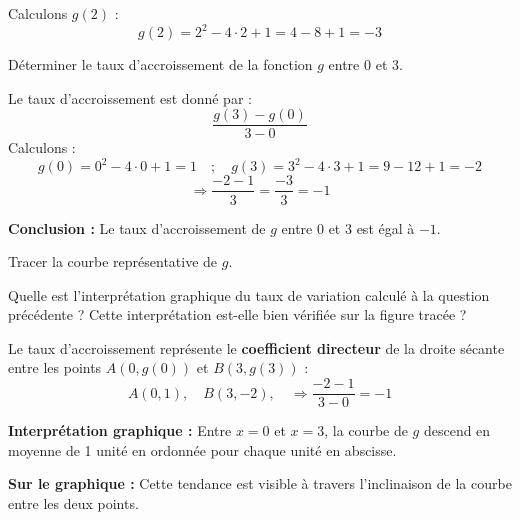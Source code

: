 \documentclass{exam}
\begin{document}
\begin{questions}
\begin{solution}
Calculons $g(2)$ :
\[
g(2) = 2^2 - 4 \cdot 2 + 1 = 4 - 8 + 1 = -3
\]

\begin{center}
\end{center}
\end{solution}

\question Déterminer le taux d’accroissement de la fonction $g$ entre $0$ et $3$.
\begin{solution}
Le taux d'accroissement est donné par :
\[
\frac{g(3) - g(0)}{3 - 0}
\]
Calculons :
\[
g(0) = 0^2 - 4 \cdot 0 + 1 = 1 \quad ; \quad g(3) = 3^2 - 4 \cdot 3 + 1 = 9 - 12 + 1 = -2
\]
\[
\Rightarrow \frac{-2 - 1}{3} = \frac{-3}{3} = -1
\]

\textbf{Conclusion :} Le taux d’accroissement de $g$ entre $0$ et $3$ est égal à $-1$.
\end{solution}

\question Tracer la courbe représentative de $g$.

\question Quelle est l’interprétation graphique du taux de variation calculé à la question précédente ? Cette interprétation est-elle bien vérifiée sur la figure tracée ?
\begin{solution}
Le taux d’accroissement représente le \textbf{coefficient directeur} de la droite sécante entre les points $A(0, g(0))$ et $B(3, g(3))$ :
\[
A(0, 1), \quad B(3, -2), \quad \Rightarrow \frac{-2 - 1}{3 - 0} = -1
\]

\textbf{Interprétation graphique :} Entre $x = 0$ et $x = 3$, la courbe de $g$ descend en moyenne de 1 unité en ordonnée pour chaque unité en abscisse.

\textbf{Sur le graphique :} Cette tendance est visible à travers l'inclinaison de la courbe entre les deux points.
\end{solution}

\end{questions}
\end{document}
